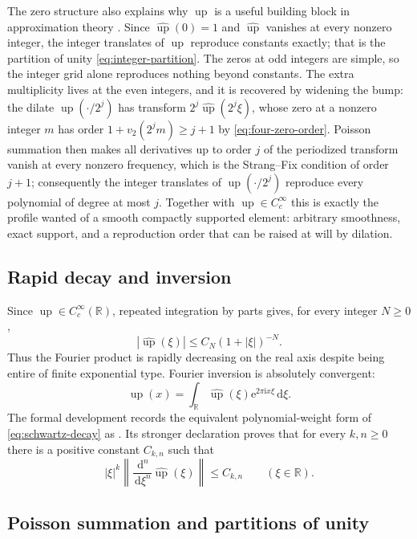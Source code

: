 \documentclass[11pt,oneside]{article}
\theoremstyle{definition}
\theoremstyle{remark}
\newcommand{\R}{\mathbb R}
\newcommand{\Up}{\operatorname{up}}
\newcommand{\e}{\mathrm e}
\newcommand{\ii}{\mathrm i}
\newcommand{\dd}{\,\mathrm d}
\newcommand{\vtwo}{v_2}
\begin{document}
The zero structure also explains why $\Up$ is a useful building block in approximation
theory \cite{rvachev1990}.  Since $\widehat{\Up}(0)=1$ and $\widehat{\Up}$ vanishes at every
nonzero integer, the integer translates of $\Up$ reproduce constants exactly; that is the
partition of unity \eqref{eq:integer-partition}.  The zeros at odd integers are simple, so
the integer grid alone reproduces nothing beyond constants.  The extra multiplicity lives at
the even integers, and it is recovered by widening the bump: the dilate $\Up(\cdot/2^j)$ has
transform $2^j\widehat{\Up}(2^j\xi)$, whose zero at a nonzero integer $m$ has order
$1+\vtwo(2^jm)\ge j+1$ by \eqref{eq:four-zero-order}.  Poisson summation then makes all
derivatives up to order $j$ of the periodized transform vanish at every nonzero frequency,
which is the Strang--Fix condition of order $j+1$; consequently the integer translates of
$\Up(\cdot/2^j)$ reproduce every polynomial of degree at most $j$.  Together with
$\Up\in C_c^\infty$ this is exactly the profile wanted of a smooth compactly supported
element: arbitrary smoothness, exact support, and a reproduction order that can be raised at
will by dilation.

\subsection{Rapid decay and inversion}

Since $\Up\in C_c^\infty(\R)$, repeated integration by parts gives, for every integer
$N\ge0$,
\begin{equation}
 |\widehat{\Up}(\xi)|\le C_N(1+|\xi|)^{-N}.                \label{eq:schwartz-decay}
\end{equation}
Thus the Fourier product is rapidly decreasing on the real axis despite being entire of
finite exponential type.  Fourier inversion is absolutely convergent:
\begin{equation}
 \Up(x)=\int_\R\widehat{\Up}(\xi)\e^{2\pi\ii x\xi}\dd\xi. \label{eq:fourier-inversion}
\end{equation}
The formal development records the equivalent polynomial-weight form of
\eqref{eq:schwartz-decay} as .  Its stronger declaration
 proves that for every
$k,n\ge0$ there is a positive constant $C_{k,n}$ such that
\[
 |\xi|^k\left\|\frac{\dd^n}{\dd\xi^n}\widehat{\Up}(\xi)\right\|\le C_{k,n}
 \qquad(\xi\in\R).
\]

\subsection{Poisson summation and partitions of unity}
\end{document}
